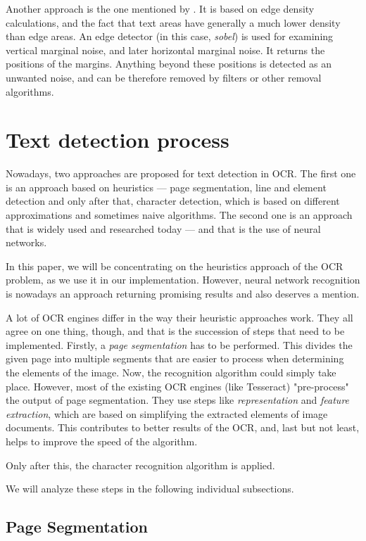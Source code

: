 Another approach is the one mentioned by \citet{marginalNoiseEdge}. It is based on edge density calculations, and the fact that text areas have generally a much lower density than edge areas. An edge detector (in this case, \emph{sobel}) is used for examining vertical marginal noise, and later horizontal marginal noise. It returns the positions of the margins. Anything beyond these positions is detected as an unwanted noise, and can be therefore removed by filters or other removal algorithms.

\section{Text detection process}

Nowadays, two approaches are proposed for text detection in OCR. The first one is an approach based on heuristics --- page segmentation, line and element detection and only after that, character detection, which is based on different approximations and sometimes naive algorithms. The second one is an approach that is widely used and researched today --- and that is the use of neural networks.

In this paper, we will be concentrating on the heuristics approach of the OCR problem, as we use it in our implementation. However, neural network recognition is nowadays an approach returning  promising results and also deserves a mention.

A lot of OCR engines differ in the way their heuristic approaches work. They all agree on one thing, though, and that is the succession of steps that need to be implemented. Firstly, a \emph{page segmentation} has to be performed. This divides the given page into multiple segments that are easier to process when determining the elements of the image. Now, the recognition algorithm could simply take place. However, most of the existing OCR engines (like Tesseract) "pre-process" the output of page segmentation. They use steps like \emph{representation} and \emph{feature extraction}, which are based on simplifying the extracted elements of image documents. This contributes to better results of the OCR, and, last but not least, helps to improve the speed of the algorithm.

Only after this, the character recognition algorithm is applied.

We will analyze these steps in the following individual subsections.

\subsection{Page Segmentation}

